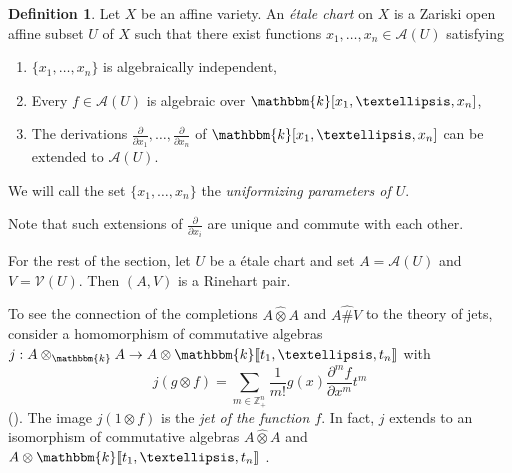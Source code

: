\documentclass[12pt]{amsart}
\newcommand{\A}{{\mathcal{A}}}
\renewcommand{\k}{{\mathbbm{k}}}
\newcommand{\V}{{\mathcal{V}}}
\newcommand{\Z}{{\mathbb{Z}}}
\renewcommand{\sp}{{\#}}
\newcommand{\dx}[1]{{\frac{\partial}{\partial x_{#1}}}}
\newtheorem{lemma}[theorem]{Lemma}
\theoremstyle{definition}
\newtheorem{definition}{Definition}[section]
\begin{document}
\begin{definition}
Let $X$ be an affine variety. An \emph{\'{e}tale chart} on $X$ is a Zariski open affine subset $U$ of $X$ such that there exist functions $x_1, \dots, x_n \in \A(U)$ satisfying
\begin{enumerate}[label=(\roman*)]
\item $\{x_1, \dots, x_n\}$ is algebraically independent,
\item Every $f \in \A(U)$ is algebraic over $\k[x_1, \dots, x_n]$,
\item The derivations $\dx{1}, \dots, \dx{n}$ of $\k[x_1, \dots, x_n]$ can be extended to $\A(U)$.
\end{enumerate}
We will call the set $\{x_1, \dots, x_n\}$ the \emph{uniformizing parameters of $U$}. 
\end{definition}
Note that such extensions of $\dx{i}$ are unique and commute with each other. %


For the rest of the section, let $U$ be a \'etale chart and set $A = \A(U)$ and $V = \V(U)$. Then $(A, V)$ is a Rinehart pair.

To see the connection of the completions $A \widehat{\otimes} A$ and
$A \widehat{\sp} V$ to the theory of jets, consider
a homomorphism of commutative algebras $j: A \otimes_\k A \rightarrow A \otimes\k\llbracket t_1, \dots, t_n \rrbracket$ with
\[
j(g \otimes f)  = \sum_{m \in \Z_{+}^n} \frac{1}{m!} g(x) \frac{\partial^m f}{\partial x^m} t^m
\]
(\cite[Lemma 10]{BilligIngalls}). 
The image $j(1 \otimes f)$ is the \emph{jet of the function $f$}. 
In fact, $j$ extends to an isomorphism of commutative algebras $A \widehat{\otimes} A$ and $A \otimes \k \llbracket t_1, \dots, t_n \rrbracket$ \cite[Corollary 18]{BilligIngalls}. 
\end{document}
